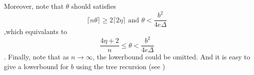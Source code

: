 \documentclass{article}
\begin{document}
Moreover, note that $\theta$ should satisfies
\[\lceil n\theta\rceil \geq 2\lceil 2\eta \rceil \mbox{ and } \theta < \frac{b^2}{4e\Delta}\]
,which equivalants to
\[\frac{4\eta + 2}{n} \leq \theta < \frac{b^2}{4e\Delta}\].
Finally, note that as $n\to\infty$, the lowerbound could be omitted.
And it is easy to give a lowerbound for $b$ using the tree recursion (see \cite{CLV20-1})



\clearpage


\end{document}
